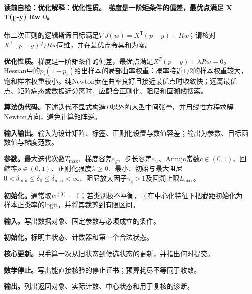 \label{struct:V2-C05-CH16}
\paragraph{读前自检：优化解释：优化性质。 梯度是一阶矩条件的偏差，最优点满足 X T(p-y) Rw 0。}带二次正则的逻辑斯谛目标满足$\nabla J(w)=X^{\mathsf T}(p-y)+Rw$；请核对$X^{\mathsf T}(p-y)$与$Rw$同维，并在最优点令其和为零。\par

\begin{optimizationbox}
\textbf{优化性质。}梯度是一阶矩条件的偏差，最优点满足$X^T(p-y)+\lambda Rw=0$。Hessian中的$p_i(1-p_i)$给出样本的局部曲率权重：概率接近$1/2$的样本权重较大，饱和样本权重较小。纯Newton步在曲率良好且接近最优点时收敛快；远离最优点、矩阵病态或数据近分离时，应配合正则化、阻尼和回溯线搜索。
\end{optimizationbox}

\label{struct:V2-C05-CH10}
\label{struct:V2-C05-CH19}
\textbf{算法伪代码。}下述迭代不显式构造$D$以外的大型中间张量，并用线性方程求解Newton方向，避免计算矩阵逆。

\label{struct:V2-C05-CH20}
\textbf{输入输出。}输入为设计矩阵、标签、正则化设置与数值容差；输出为参数、目标函数值与梯度范数。

\label{struct:V2-C05-CH21}
\textbf{参数。}最大迭代次数$T_{\max}$、梯度容差$\varepsilon_g$、步长容差$\varepsilon_w$、Armijo常数$c\in(0,1)$、回缩率$\rho\in(0,1)$、正则化强度$\lambda\geq0$、最小、初始与最大阻尼$0<\delta_{\min}\leq\delta_0\leq\delta_{\max}<\infty$、阻尼放大因子$\gamma_\delta>1$及回溯上限$L_{\max}$。

\label{struct:V2-C05-CH22}
\textbf{初始化。}通常取$w^{(0)}=0$；若类别极不平衡，可在中心化特征下把截距初始化为样本正类率的logit，并将其裁剪到有限区间。

\begin{keypointbox}[title={带回溯线搜索的阻尼Newton逻辑斯谛回归：五步阅读}]
\textbf{输入。}写出数据对象、固定参数与必须成立的条件。\par
\textbf{初始化。}标明主状态、计数器和第一个合法状态。\par
\textbf{核心更新。}只手算一次从旧状态到候选状态的更新，并指出何时提交。\par
\textbf{数学停止。}写出能直接核验的停止证书；预算耗尽不等同于收敛。\par
\textbf{输出。}列出返回对象、实际计数、中心状态和用于复核的诊断。
\end{keypointbox}

